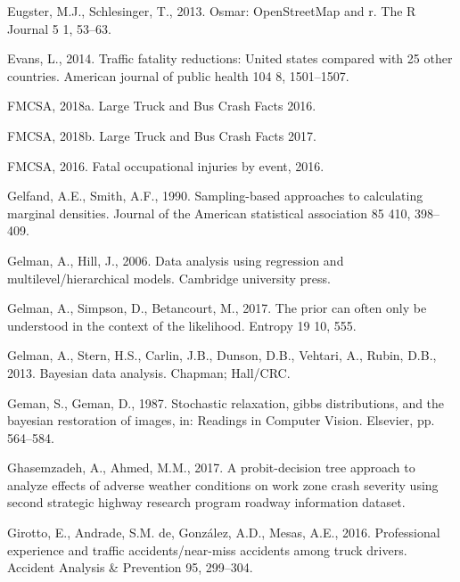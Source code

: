 \documentclass[12pt]{book}
\numberwithin{equation}{chapter}
\begin{document}
\leavevmode\hypertarget{ref-eugster2013osmar}{}%
Eugster, M.J., Schlesinger, T., 2013. Osmar: OpenStreetMap and r. The R Journal 5 1, 53--63.

\leavevmode\hypertarget{ref-evans2014traffic}{}%
Evans, L., 2014. Traffic fatality reductions: United states compared with 25 other countries. American journal of public health 104 8, 1501--1507.

\leavevmode\hypertarget{ref-fmcsareport2016}{}%
FMCSA, 2018a. Large Truck and Bus Crash Facts 2016.

\leavevmode\hypertarget{ref-fmcsareport2017}{}%
FMCSA, 2018b. Large Truck and Bus Crash Facts 2017.

\leavevmode\hypertarget{ref-fmcsafacts2016}{}%
FMCSA, 2016. Fatal occupational injuries by event, 2016.

\leavevmode\hypertarget{ref-gelfand1990sampling}{}%
Gelfand, A.E., Smith, A.F., 1990. Sampling-based approaches to calculating marginal densities. Journal of the American statistical association 85 410, 398--409.

\leavevmode\hypertarget{ref-gelman2006data}{}%
Gelman, A., Hill, J., 2006. Data analysis using regression and multilevel/hierarchical models. Cambridge university press.

\leavevmode\hypertarget{ref-gelman2017prior}{}%
Gelman, A., Simpson, D., Betancourt, M., 2017. The prior can often only be understood in the context of the likelihood. Entropy 19 10, 555.

\leavevmode\hypertarget{ref-gelman2013bayesian}{}%
Gelman, A., Stern, H.S., Carlin, J.B., Dunson, D.B., Vehtari, A., Rubin, D.B., 2013. Bayesian data analysis. Chapman; Hall/CRC.

\leavevmode\hypertarget{ref-geman1987stochastic}{}%
Geman, S., Geman, D., 1987. Stochastic relaxation, gibbs distributions, and the bayesian restoration of images, in: Readings in Computer Vision. Elsevier, pp. 564--584.

\leavevmode\hypertarget{ref-ghasemzadeh2017probit}{}%
Ghasemzadeh, A., Ahmed, M.M., 2017. A probit-decision tree approach to analyze effects of adverse weather conditions on work zone crash severity using second strategic highway research program roadway information dataset.

\leavevmode\hypertarget{ref-girotto2016professional}{}%
Girotto, E., Andrade, S.M. de, González, A.D., Mesas, A.E., 2016. Professional experience and traffic accidents/near-miss accidents among truck drivers. Accident Analysis \& Prevention 95, 299--304.
\end{document}

